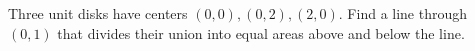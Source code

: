 Three unit disks have centers $(0,0),(0,2),(2,0)$. Find a line through $(0,1)$ that divides their union into equal areas above and below the line.

